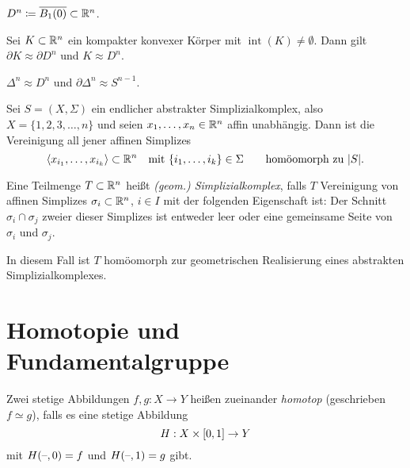 \documentclass{cheat-sheet}
\DeclareMathOperator{\inte}{int} %
\begin{document}
\begin{nota}
  $D^n \coloneqq \overline{B_1(0)} \subset \mathbb{R}^n$.
\end{nota}

\begin{prop}
  Sei $K \subset \mathbb{R}^n$ ein kompakter konvexer Körper mit $\inte(K) \not= \emptyset$. Dann gilt $\partial K \approx \partial D^n$ und $K \approx D^n$.
\end{prop}

\begin{kor}
  $\Delta^n \approx D^n$ und $\partial \Delta^n \approx S^{n-1}$.
\end{kor}

\begin{prop}
  Sei $S = (X, \Sigma)$ ein endlicher abstrakter Simplizialkomplex, also $X = \{ 1, 2, 3, \ldots, n \}$ und seien $x_1, \ldots, x_n \in \mathbb{R}^n$ affin unabhängig. Dann ist die Vereinigung all jener affinen Simplizes
  \[
    \langle x_{i_1}, \ldots, x_{i_k} \rangle \subset \mathbb{R}^n \quad
    \text{mit $\{ i_1, \ldots, i_k \} \in \Sigma$} \qquad
    \text{homöomorph zu $\lvert S\rvert$.}
  \]
\end{prop}

\begin{defn}
  Eine Teilmenge $T \subset \mathbb{R}^n$ heißt \emph{(geom.) Simplizialkomplex}, falls $T$ Vereinigung von affinen Simplizes $\sigma_i \subset \mathbb{R}^n$, $i \in I$ mit der folgenden Eigenschaft ist: Der Schnitt $\sigma_i \cap \sigma_j$ zweier dieser Simplizes ist entweder leer oder eine gemeinsame Seite von $\sigma_i$ und $\sigma_j$.
\end{defn}

\begin{samepage}

\begin{bem}
  In diesem Fall ist $T$ homöomorph zur geometrischen Realisierung eines abstrakten Simplizialkomplexes.
\end{bem}

\section{Homotopie und Fundamentalgruppe}


\begin{defn}
  Zwei stetige Abbildungen $f, g : X \to Y$ heißen zueinander \emph{homotop} (geschrieben $f \simeq g$), falls es eine stetige Abbildung
  \[ H : X \times \left[ 0, 1 \right] \to Y \]
  mit $H(\text{--}, 0) = f$ und $H(\text{--}, 1) = g$ gibt.
\end{defn}

\end{samepage}
\end{document}
